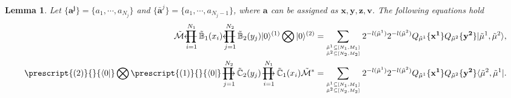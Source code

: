 \documentclass[11pt,reqno]{amsart}
\numberwithin{equation}{section}
\newtheorem{lemma}[theorem]{Lemma}
\def\lprod{\mathop{\prod{\mkern-29.5mu}{\mathbf\longleftarrow}}}
\def\rprod{\mathop{\prod{\mkern-28.0mu}{\mathbf\longrightarrow}}}
\begin{document}
	
	
	
	\begin{lemma}\label{M-n-0-schur}
		Let
		$\{\mathbf{a^j}\}=\{a_1,\cdots,a_{N_j}\}$  and $\{\bar{\mathbf{a}}^j\}=\{a_1,\cdots,a_{N_j-1}\}$, where $\mathbf{a}$ can be assigned as $\mathbf{x},\mathbf{y},\mathbf{z},\mathbf{v}$.
		The following equations hold
		\begin{align}
			\tilde{\mathcal{M}}
			\lprod_{i=1}^{N_1} \tilde{\mathbb{B}}_{1}(x_i)
			\lprod_{j=1}^{N_2} \tilde{\mathbb{B}}_{2}(y_j)
			|0\rangle^{(1)}\bigotimes|0\rangle^{(2)}
			= &\sum_{{ \tilde{\mu}^{1} \subseteq [N_1,M_1]}\atop{\tilde{\mu}^{2} \subseteq [N_2,M_2]}}
			2^{-l(\tilde{\mu}^{1})}	2^{-l(\tilde{\mu}^{2})}
			Q_{\tilde{\mu}^{1}}\{\mathbf{x^1}\}  Q_{\tilde{\mu}^{2}}\{\mathbf{y^2}\}
			| \tilde{\mu}^{1},\tilde{\mu}^{2} \rangle,\label{M-B1-BN-schur}	\\	
			\prescript{(2)}{}{\langle 0|}\bigotimes \prescript{(1)}{}{\langle 0|}
			\rprod_{j=1}^{N_2} \tilde{\mathbb{C}}_{2}(y_j)
			\rprod_{i=1}^{N_1} \tilde{\mathbb{C}}_{1}(x_i)\tilde{\mathcal{M}}^*
			= &\sum_{{ \tilde{\mu}^{1} \subseteq [N_1,M_1]}\atop{\tilde{\mu}^{2} \subseteq [N_2,M_2]}}
			2^{-l(\tilde{\mu}^{1})}	2^{-l(\tilde{\mu}^{2})}
			Q_{\tilde{\mu}^{1}}\{\mathbf{x^1}\}  Q_{\tilde{\mu}^{2}}\{\mathbf{y^2}\}
			\langle \tilde{\mu}^{2},\tilde{\mu}^{1}|.\label{M-C1-CN-schur}
		\end{align}	
	\end{lemma}
\end{document}
